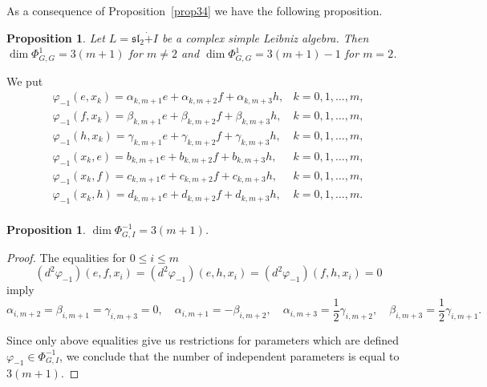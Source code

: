 \documentclass[12pt,reqno]{amsart}
\newtheorem{prop}[thm]{Proposition}
\numberwithin{equation}{section}
\begin{document}
As a consequence of Proposition~\ref{prop34} we have the following proposition.

\begin{prop}  Let $L= \mathfrak{sl}_2\dot{+}I$ be a complex simple Leibniz algebra. Then $\dim\Phi_{G,G}^{1}=3(m+1)$ for $m\neq2$ and $\dim\Phi_{G,G}^{1}=3(m+1)-1$ for $m=2$.
\end{prop}

We put
\[
\begin{array}{ll}
\varphi_{-1}(e,x_k) = \alpha_{k,m+1}e+\alpha_{k,m+2}f+\alpha_{k,m+3}h, &   k=0,1,\dots,m, \\[1mm]
\varphi_{-1}(f,x_k) = \beta_{k,m+1}e+\beta_{k,m+2}f+\beta_{k,m+3}h, &   k=0,1,\dots,m, \\[1mm]
\varphi_{-1}(h,x_k) = \gamma_{k,m+1}e+\gamma_{k,m+2}f+\gamma_{k,m+3}h, &   k=0,1,\dots,m, \\[1mm]
\varphi_{-1}(x_k,e) = b_{k,m+1}e+b_{k,m+2}f+b_{k,m+3}h, &   k=0,1,\dots,m, \\[1mm]
\varphi_{-1}(x_k,f) = c_{k,m+1}e+c_{k,m+2}f+c_{k,m+3}h, &   k=0,1,\dots,m, \\[1mm]
\varphi_{-1}(x_k,h) = d_{k,m+1}e+d_{k,m+2}f+d_{k,m+3}h, &   k=0,1,\dots,m. \\[1mm]
\end{array} \]

\begin{prop} $\dim\Phi_{G,I}^{-1}=3(m+1)$.
\end{prop}
\begin{proof}
The equalities for $0 \leq i \leq m$
\[(d^2\varphi_{-1})(e, f, x_i)=(d^2\varphi_{-1})(e,
h, x_i)=(d^2\varphi_{-1})(f, h, x_i)=0\]
imply
\[\alpha_{i,m+2}=\beta_{i, m+1}=\gamma_{i, m+3}=0, \quad \alpha_{i, m+1}=-\beta_{i, m+2}, \quad \alpha_{i, m+3}=\frac{1}{2}\gamma_{i, m+2}, \quad  \beta_{i, m+3}=\frac{1}{2}\gamma_{i, m+1}.\]

Since only above equalities give us restrictions for parameters which are defined $\varphi_{-1}\in \Phi_{G,I}^{-1}$,
 we conclude that the number of independent parameters is equal to $3(m+1)$.
\end{proof}
\end{document}
